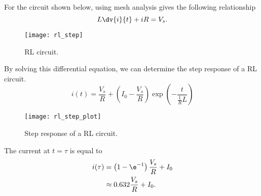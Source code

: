 \documentclass{article}
\begin{document}
\begin{definition}
    For the circuit shown below, using mesh analysis gives the following relationship
    \begin{equation*}
        L\dv{i}{t} + iR = V_s.
    \end{equation*}
    \begin{figure}[H]
        \centering
        \texttt{[image: rl\_step]}
        \caption{RL circuit.}
    \end{figure}
    By solving this differential equation, we can determine the step response of a
    RL circuit.
    \begin{equation*}
        i(t) = \frac{V_s}{R} + \left(I_0 - \frac{V_s}{R}\right)\exp{\left( -\frac{t}{\frac{1}{R}L} \right)}
    \end{equation*}
    \begin{figure}[H]
        \centering
        \texttt{[image: rl\_step\_plot]}
        \caption{Step response of a RL circuit.}
    \end{figure}
    The current at $t = \tau$ is equal to
    \begin{align*}
        i(\tau) & = \left( 1 - \e^{-1} \right)\frac{V_s}{R} + I_0 \\
                & \approx 0.632\frac{V_s}{R} + I_0.
    \end{align*}
\end{definition}
\newpage
\end{document}
